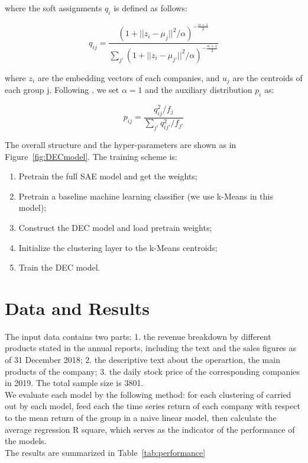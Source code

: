\documentclass[12pt]{article}
\begin{document}
\noindent where the soft assignments $q_i$ is defined as follows:

\begin{equation}
    q_{ij}=\frac{(1+||z_i-\mu_j||^2/\alpha)^{-\frac{\alpha+1}{2}}}{\sum_{j'}(1+||z_i-\mu_{j'}||^2/\alpha)^{-\frac{\alpha+1}{2}}}
\end{equation}

\noindent where $z_i$ are the embedding vectors of each companies, and $u_j$ are the centroids of each group j. 
Following \cite{pmlr-v48-xieb16}, we set $\alpha=1$ and the auxiliary distribution $p_i$ as:

\begin{equation}
    p_{ij}=\frac{q_{ij}^2/f_j}{\sum_{j'}q_{ij'}^2/f_{j'}}
\end{equation}

The overall structure and the hyper-parameters are shown as in Figure~\ref{fig:DECmodel}. The training scheme is:
\begin{enumerate}
    \item Pretrain the full SAE model and get the weights;
    \item Pretrain a baseline machine learning classifier (we use k-Means in this model);
    \item Construct the DEC model and load pretrain weights;
    \item Initialize the clustering layer to the k-Means centroids;
    \item Train the DEC model.
\end{enumerate}



\section{Data and Results} \label{sec:data and results}

The input data contains two parts: 1. the revenue breakdown by different products stated in the annual reports, 
including the text and the sales figures as of 31 December 2018; 2. the descriptive text about the operartion, 
the main products of the company; 3. the daily stock price of the corresponding companies in 2019.
The total sample size is 3801.\\
We evaluate each model by the following method: for each clustering of carried out by each model, feed each
the time series return of each company with respect to the mean return of the group in a naive linear model, 
then calculate the average regression R square, which serves as the indicator of the performance of the models.\\
The results are summarized in Table~\ref{tab:performance}
\end{document}
